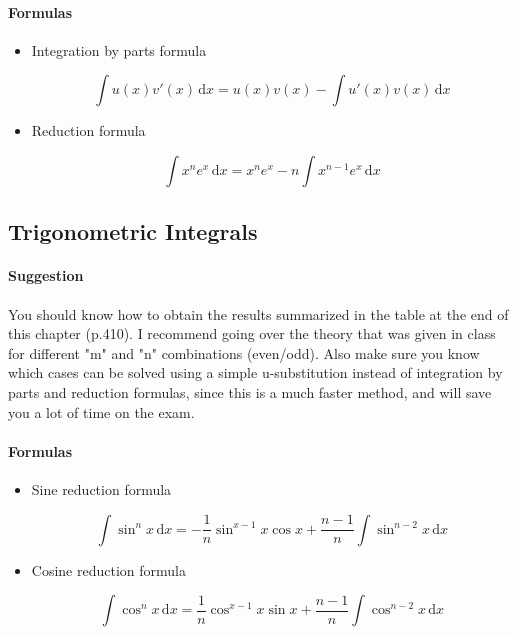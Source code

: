 \documentclass[11pt]{article}
\begin{document}
		\paragraph{Formulas} 
			\begin{itemize}
				\item Integration by parts formula
					
					\begin{equation*}
					\int \! u(x)v'(x) \, \mathrm{d}x = u(x)v(x) - \int \! u'(x)v(x) \, \mathrm{d}x
					\end{equation*}
					
					
				\item Reduction formula
					
					\begin{equation*}
					\int \! x^n e^x \, \mathrm{d}x = x^n e^x - n\int \! x^{n - 1}e^x \, \mathrm{d}x
					\end{equation*}
				\end{itemize}
				\pagebreak
	\subsection{Trigonometric Integrals}
		\paragraph{Suggestion} 
		You should know how to obtain the results summarized in the table at the end of this chapter (p.410).
I recommend going over the theory that was given in class for different "m" and "n" combinations (even/odd).
Also make sure you know which cases can be solved using a simple u-substitution instead of integration by parts and reduction formulas, since this is a much faster method, and will save you a lot of time on the exam.
		\paragraph{Formulas} 
			\begin{itemize}
				\item Sine reduction formula
					
					\begin{equation*}
						\int \! \sin^n x \, \mathrm{d}x = 
						- \frac{1}{n}\sin^{x - 1}x\cos x + \frac{n -1}{n}\int \! \sin^{n - 2}x \, \mathrm{d}x
					\end{equation*}
					
					\item Cosine reduction formula
					
					\begin{equation*}
						\int \! \cos^n x \, \mathrm{d}x = 
						\frac{1}{n}\cos^{x - 1}x\sin x + \frac{n - 1}{n}\int \! \cos^{n - 2}x \, \mathrm{d}x
					\end{equation*}
					
				\end{itemize}
				
\end{document}
